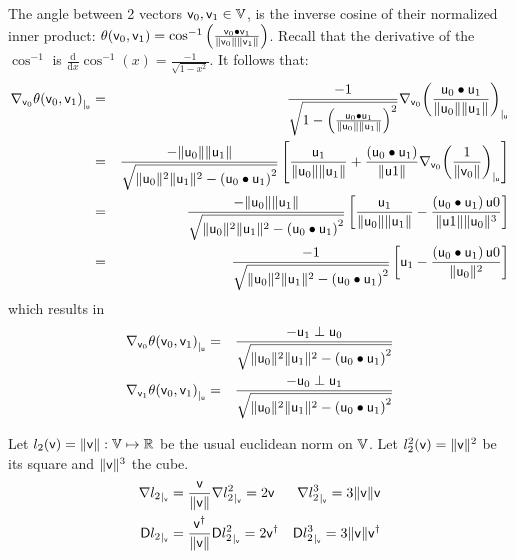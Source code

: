 The angle between 2 vectors $\mathsf{v}_0, \mathsf{v}_1 \in \mathbb{V}$,
is the inverse cosine of their normalized inner product:
$\theta(\mathsf{v}_0,\mathsf{v}_1)
=
\cos^{-1} \left( \frac{ \mathsf{v}_0 \bullet \mathsf{v}_1 } {\|\mathsf{v}_0\| \|\mathsf{v}_1\|} \right)$.
Recall that the derivative of the $\cos^{-1}$ is
$\frac{\mathrm d}{\mathrm dx} \cos^{-1}(x) = \frac{-1}{\sqrt{1 - x^2} }$.
It follows that:
\begin{eqnarray*}
{\mathbf \nabla}_{\mathsf{v}_0}{{\theta(\mathsf{v}_0,\mathsf{v}_1)}}_{\mid_{\mathsf{u}}}
& = &
\frac{-1}
{ \sqrt{1 - \left( \frac{\mathsf{u}_0 \bullet \mathsf{u}_1}{\| \mathsf{u}_0 \| \| \mathsf{u}_1 \|} \right)^2 }}
{\mathbf \nabla}_{\mathsf{v}_0}{{\left( \frac{\mathsf{u}_0 \bullet \mathsf{u}_1}{\| \mathsf{u}_0 \| \| \mathsf{u}_1 \|} \right)}}_{\mid_{\mathsf{u}}}
\\
& = &
\frac{-\|\mathsf{u}_0\|\|\mathsf{u}_1\|}
{ \sqrt{\|\mathsf{u}_0\|^2\|\mathsf{u}_1\|^2 - \left( \mathsf{u}_0 \bullet \mathsf{u}_1 \right)^2 }}
\left[
\frac{\mathsf{u}_1}{\|\mathsf{u}_0\|\|\mathsf{u}_1\|}
+
\frac{\left( \mathsf{u}_0 \bullet \mathsf{u}_1 \right)}{\| \mathsf{u}1 \|}
{\mathbf \nabla}_{\mathsf{v}_0}{{\left( \frac{1}{\| \mathsf{v}_0 \|} \right)}}_{\mid_{\mathsf{u}}}
\right]
\nonumber
\\
& = &
\frac{-\|\mathsf{u}_0\|\|\mathsf{u}_1\|}
{ \sqrt{\|\mathsf{u}_0\|^2\|\mathsf{u}_1\|^2 - \left( \mathsf{u}_0 \bullet \mathsf{u}_1 \right)^2 }}
\left[
\frac{\mathsf{u}_1}{\|\mathsf{u}_0\|\|\mathsf{u}_1\|}
-
\frac{\left( \mathsf{u}_0 \bullet \mathsf{u}_1 \right) \mathsf{u}0}{\| \mathsf{u}1 \| \|\mathsf{u}_0\|^3}
\right]
\nonumber
\\
& = &
\frac{-1}
{ \sqrt{\|\mathsf{u}_0\|^2\|\mathsf{u}_1\|^2 - \left( \mathsf{u}_0 \bullet \mathsf{u}_1 \right)^2 }}
\left[
\mathsf{u}_1
-
\frac{\left( \mathsf{u}_0 \bullet \mathsf{u}_1 \right) \mathsf{u}0}{\|\mathsf{u}_0\|^2}
\right]
\nonumber
\end{eqnarray*}
which results in
\begin{eqnarray}
\label{eq:angle_gradient}
{\mathbf \nabla}_{\mathsf{v}_0}{{\theta(\mathsf{v}_0,\mathsf{v}_1)}}_{\mid_{\mathsf{u}}}
& = &
\frac{- \mathsf{u}_1 \perp \mathsf{u}_0}
{ \sqrt{\|\mathsf{u}_0\|^2\|\mathsf{u}_1\|^2 - \left( \mathsf{u}_0 \bullet \mathsf{u}_1 \right)^2 }}
\\
{\mathbf \nabla}_{\mathsf{v}_1}{{\theta(\mathsf{v}_0,\mathsf{v}_1)}}_{\mid_{\mathsf{u}}}
& = &
\frac{- \mathsf{u}_0 \perp \mathsf{u}_1}
{ \sqrt{\|\mathsf{u}_0\|^2\|\mathsf{u}_1\|^2 - \left( \mathsf{u}_0 \bullet \mathsf{u}_1 \right)^2 }}
\nonumber
\end{eqnarray}

\label{sec:derivatives-of-euclidean-norm}

Let $l_2(\mathsf{v}) = \| \mathsf{v}  \|: \mathbb{V} \mapsto \mathbb{R}$
be the usual euclidean norm on $\mathbb{V}$.
Let $l_2^2(\mathsf{v}) = \| \mathsf{v}  \|^2 $
be its square and $ \| \mathsf{v}  \|^3$ the cube.
\begin{eqnarray}
\label{eq:l2-gradient}
{\mathbf \nabla}{l_2}_{\mid_{\mathsf{v}}} = \frac{ \mathsf{v} }{ \| \mathsf{v}  \|} &
{\mathbf \nabla}{l_2^2}_{\mid_{\mathsf{v}}} =  2\mathsf{v} &
{\mathbf \nabla}{l_2^3}_{\mid_{\mathsf{v}}} = 3 \| \mathsf{v}  \| \mathsf{v} \\
{\mathsf{D}{l_2}_{\mid_{\mathsf{v}}}} = \frac{ \mathsf{v}^\dagger }{ \| \mathsf{v}  \|} &
{\mathsf{D}{l_2^2}_{\mid_{\mathsf{v}}}} = 2\mathsf{v}{^\dagger} &
{\mathsf{D}{l_2^3}_{\mid_{\mathsf{v}}}} = 3 \| \mathsf{v}  \| \mathsf{v}^\dagger \nonumber
\end{eqnarray}

